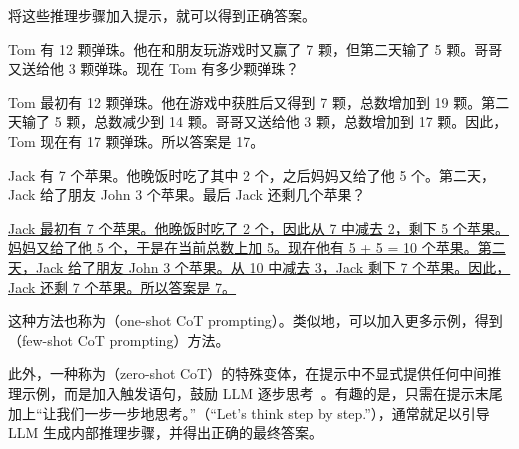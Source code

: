 将这些推理步骤加入提示，就可以得到正确答案。

\vspace{0.5em}
\begin{tcolorbox}
\begin{center}
\parbox{0.9\textwidth}
{

{\color{ugreen} Tom 有 12 颗弹珠。他在和朋友玩游戏时又赢了 7 颗，但第二天输了 5 颗。哥哥又送给他 3 颗弹珠。现在 Tom 有多少颗弹珠？}

\vspace{0.3em}

{\color{ugreen} Tom 最初有 12 颗弹珠。他在游戏中获胜后又得到 7 颗，总数增加到 19 颗。第二天输了 5 颗，总数减少到 14 颗。哥哥又送给他 3 颗，总数增加到 17 颗。因此，Tom 现在有 17 颗弹珠。所以答案是 17。}

\vspace{0.3em}

{\color{blue} Jack 有 7 个苹果。他晚饭时吃了其中 2 个，之后妈妈又给了他 5 个。第二天，Jack 给了朋友 John 3 个苹果。最后 Jack 还剩几个苹果？}

\vspace{0.3em}

\uline{Jack 最初有 7 个苹果。他晚饭时吃了 2 个，因此从 7 中减去 2，剩下 5 个苹果。妈妈又给了他 5 个，于是在当前总数上加 5。现在他有 5 + 5 = 10 个苹果。第二天，Jack 给了朋友 John 3 个苹果。从 10 中减去 3，Jack 剩下 7 个苹果。因此，Jack 还剩 7 个苹果。所以答案是 7。}

}
\end{center}
\end{tcolorbox}
\vspace{0.5em}

这种方法也称为（one-shot CoT prompting）。类似地，可以加入更多示例，得到（few-shot CoT prompting）方法。

此外，一种称为（zero-shot CoT）的特殊变体，在提示中不显式提供任何中间推理示例，而是加入触发语句，鼓励 LLM 逐步思考~\cite{kojima-etal:2022large}。有趣的是，只需在提示末尾加上“让我们一步一步地思考。”（``Let's think step by step.''），通常就足以引导 LLM 生成内部推理步骤，并得出正确的最终答案。


